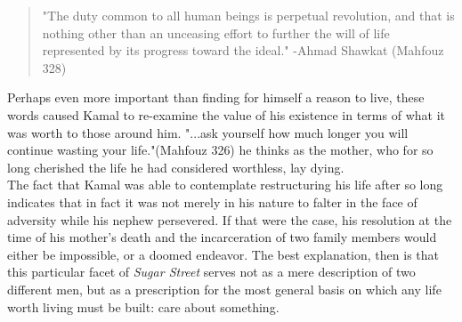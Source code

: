 \documentclass[a4paper,12pt]{article}
\providecommand{\mhfz}[1]{(Mahfouz #1)}
\begin{document}
\begin{quote}
"The duty common to all human beings is perpetual revolution, and that is nothing other than an unceasing effort to further the will of life represented by its progress toward the ideal." -Ahmad Shawkat \mhfz{328}
\end{quote}
  
Perhaps even more important than finding for himself a reason to live, these
words caused Kamal to re-examine the value of his existence in terms of what it
was worth to those around him. "...ask yourself how much longer you will
continue wasting your life."\mhfz{326} he thinks as the mother, who for so long
cherished the life he had considered worthless, lay dying.\\
\indent The fact that Kamal was able to contemplate restructuring his life
after so long indicates that in fact it was not merely in his nature to falter
in the face of adversity while his nephew persevered. If that were the case,
his resolution at the time of his mother's death and the incarceration of two
family members would either be impossible, or a doomed endeavor. The best
explanation, then is that this particular facet of \textit{Sugar Street} serves
not as a mere description of two different men, but as a prescription for the
most general basis on which any life worth living must be built: care about
something. \\
  
\newpage

\nocite{*}


\end{document}

